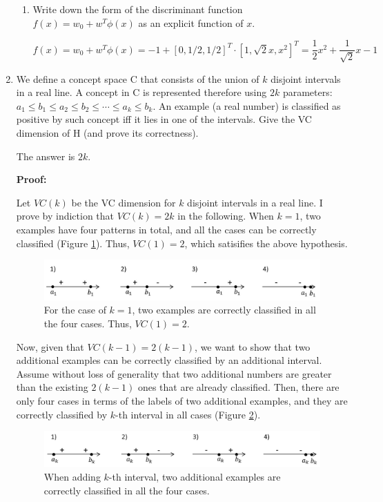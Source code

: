 \begin{enumerate}
\begin{enumerate}
\item Write down the form of the discriminant function $f(x)=w_0+w^T\phi(x)$ as an explicit function of $x$.

\[
f(x)=w_0 + w^T \phi(x)=-1 + [0, 1/2, 1/2]^T \cdot [1, \sqrt{2}x, x^2]^T=\frac{1}{2}x^2+\frac{1}{\sqrt{2}}x-1
\]

\end{enumerate}

\item We define a concept space C that consists of the union of $k$ disjoint intervals in a real line. A concept in C is represented therefore using $2k$ parameters: $a_1 \le b_1 \le a_2 \le b_2 \le \cdots \le a_k \le b_k$. An example (a real number) is classified as positive by such concept iff it lies in one of the intervals. Give the VC dimension of H (and prove its correctness).

The answer is $2k$.

{\bf Proof:}

Let $VC(k)$ be the VC dimension for $k$ disjoint intervals in a real line. I prove by indiction that $VC(k)=2k$ in the following. When $k=1$, two examples have four patterns in total, and all the cases can be correctly classified (Figure \ref{fig:vc_dimension1}). Thus, $VC(1)=2$, which satisifies the above hypothesis. 

\begin{figure}[hbtp]
\centering
\includegraphics[width=150mm]{vc_dimension1.jpg}
\caption{For the case of $k=1$, two examples are correctly classified in all the four cases. Thus, $VC(1)=2$.}
\label{fig:vc_dimension1}
\end{figure}

Now, given that $VC(k-1)=2(k-1)$, we want to show that two additional examples can be correctly classified by an additional interval. Assume without loss of generality that two additional numbers are greater than the existing $2(k-1)$ ones that are already classified. Then, there are only four cases in terms of the labels of two additional examples, and they are correctly classified by $k$-th interval in all cases (Figure \ref{fig:vc_dimension2}). 
\begin{figure}[hbtp]
\centering
\includegraphics[width=150mm]{vc_dimension2.jpg}
\caption{When adding $k$-th interval, two additional examples are correctly classified in all the four cases.}
\label{fig:vc_dimension2}
\end{figure}


\end{enumerate}
